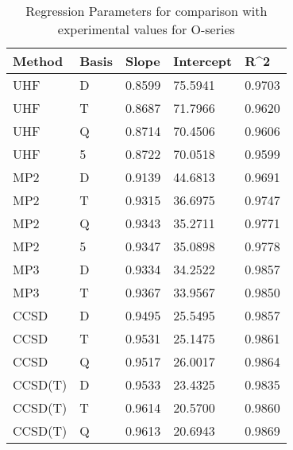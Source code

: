 \begin{table}
  \caption{Regression Parameters for comparison with experimental values for O-series}
  \label{tbl:regression-exp-o}
  \begin{tabular}{l l l l l }
    \hline
    Method & Basis & Slope & Intercept & R^2 \\ 
    \hline
    UHF & D & 0.8599 & 75.5941 & 0.9703 \\ 
    UHF & T & 0.8687 & 71.7966 & 0.9620 \\ 
    UHF & Q & 0.8714 & 70.4506 & 0.9606 \\ 
    UHF & 5 & 0.8722 & 70.0518 & 0.9599 \\ 
    MP2 & D & 0.9139 & 44.6813 & 0.9691 \\ 
    MP2 & T & 0.9315 & 36.6975 & 0.9747 \\ 
    MP2 & Q & 0.9343 & 35.2711 & 0.9771 \\ 
    MP2 & 5 & 0.9347 & 35.0898 & 0.9778 \\ 
    MP3 & D & 0.9334 & 34.2522 & 0.9857 \\ 
    MP3 & T & 0.9367 & 33.9567 & 0.9850 \\ 
    CCSD & D & 0.9495 & 25.5495 & 0.9857 \\ 
    CCSD & T & 0.9531 & 25.1475 & 0.9861 \\ 
    CCSD & Q & 0.9517 & 26.0017 & 0.9864 \\ 
    CCSD(T) & D & 0.9533 & 23.4325 & 0.9835 \\ 
    CCSD(T) & T & 0.9614 & 20.5700 & 0.9860 \\ 
    CCSD(T) & Q & 0.9613 & 20.6943 & 0.9869 \\ 
    \hline
  \end{tabular}
\end{table}
